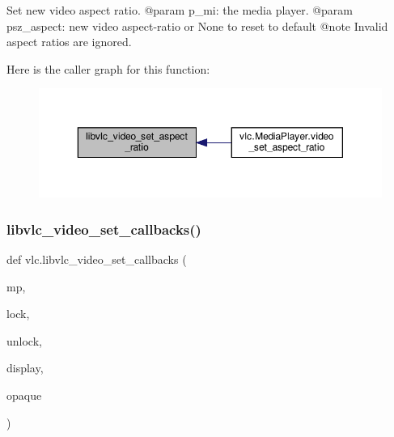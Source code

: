 \begin{DoxyVerb}Set new video aspect ratio.
@param p_mi: the media player.
@param psz_aspect: new video aspect-ratio or None to reset to default @note Invalid aspect ratios are ignored.
\end{DoxyVerb}
 Here is the caller graph for this function\+:
\nopagebreak
\begin{figure}[H]
\begin{center}
\leavevmode
\includegraphics[width=350pt]{namespacevlc_a34236e9eeb606f47fe5fc1f183ff28f8_icgraph}
\end{center}
\end{figure}
\mbox{\label{namespacevlc_abbf3342ec38822cac666ab799e12c0e0}} 
\subsubsection{\texorpdfstring{libvlc\+\_\+video\+\_\+set\+\_\+callbacks()}{libvlc\_video\_set\_callbacks()}}
{\footnotesize\ttfamily def vlc.\+libvlc\+\_\+video\+\_\+set\+\_\+callbacks (\begin{DoxyParamCaption}\item[{}]{mp,  }\item[{}]{lock,  }\item[{}]{unlock,  }\item[{}]{display,  }\item[{}]{opaque }\end{DoxyParamCaption})}

